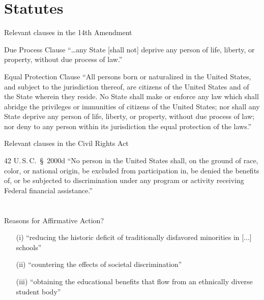 \documentclass[ignorenonframetext, aspectratio=169]{beamer}
\begin{document}
\section{Statutes}

\begin{frame}{Relevant clauses in the 14th Amendment}
\begin{block}{Due Process Clause}
	``\ldots any State [shall not] deprive any person of life, liberty, or property, without due process of law.''
\end{block}
\begin{block}{Equal Protection Clause}
	``All persons born or naturalized in the United States, and subject to the jurisdiction thereof, are citizens of the United States and of the State wherein they reside. No State shall make or enforce any law which shall abridge the privileges or immunities of citizens of the United States; nor shall any State deprive any person of life, liberty, or property, without due process of law; nor deny to any person within its jurisdiction the equal protection of the laws.''
\end{block}
\end{frame}

\begin{frame}{Relevant clauses in the Civil Rights Act}
\begin{block}{42 U.\,S.\,C.\ \S\ 2000d}
	``No person in the United States shall, on the ground of race, color, or national origin, be excluded from participation in, be denied the benefits of, or be subjected to discrimination under any program or activity receiving Federal financial assistance.''
\end{block}
\end{frame}

\section{}

\begin{frame}{Reasons for Affirmative Action?}
\begin{enumerate}
	\item[(i)] ``reducing the historic deficit of traditionally disfavored minorities in [...] schools''
	\item[(ii)] ``countering the effects of societal discrimination''
	\item[(iii)] ``obtaining the educational benefits that flow from an ethnically diverse student body''
\end{enumerate}
\end{frame}
\end{document}
